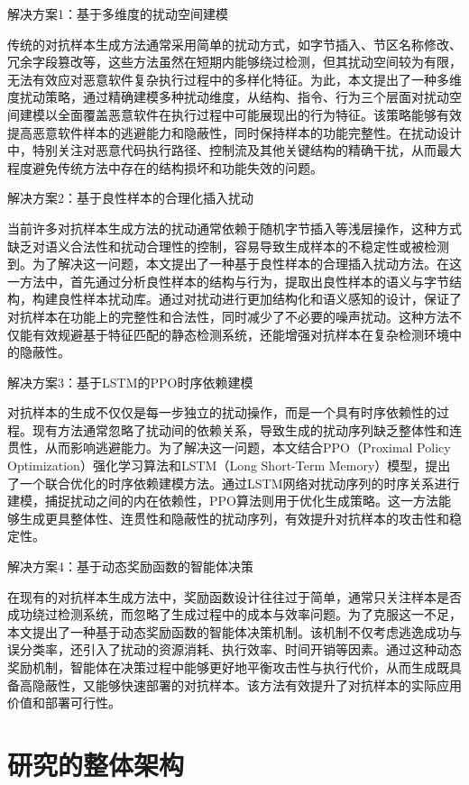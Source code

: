 解决方案1：基于多维度的扰动空间建模

传统的对抗样本生成方法通常采用简单的扰动方式，如字节插入、节区名称修改、冗余字段篡改等，这些方法虽然在短期内能够绕过检测，但其扰动空间较为有限，无法有效应对恶意软件复杂执行过程中的多样化特征。为此，本文提出了一种多维度扰动策略，通过精确建模多种扰动维度，从结构、指令、行为三个层面对扰动空间建模以全面覆盖恶意软件在执行过程中可能展现出的行为特征。该策略能够有效提高恶意软件样本的逃避能力和隐蔽性，同时保持样本的功能完整性。在扰动设计中，特别关注对恶意代码执行路径、控制流及其他关键结构的精确干扰，从而最大程度避免传统方法中存在的结构损坏和功能失效的问题。

解决方案2：基于良性样本的合理化插入扰动

当前许多对抗样本生成方法的扰动通常依赖于随机字节插入等浅层操作，这种方式缺乏对语义合法性和扰动合理性的控制，容易导致生成样本的不稳定性或被检测到。为了解决这一问题，本文提出了一种基于良性样本的合理插入扰动方法。在这一方法中，首先通过分析良性样本的结构与行为，提取出良性样本的语义与字节结构，构建良性样本扰动库。通过对扰动进行更加结构化和语义感知的设计，保证了对抗样本在功能上的完整性和合法性，同时减少了不必要的噪声扰动。这种方法不仅能有效规避基于特征匹配的静态检测系统，还能增强对抗样本在复杂检测环境中的隐蔽性。

解决方案3：基于LSTM的PPO时序依赖建模

对抗样本的生成不仅仅是每一步独立的扰动操作，而是一个具有时序依赖性的过程。现有方法通常忽略了扰动间的依赖关系，导致生成的扰动序列缺乏整体性和连贯性，从而影响逃避能力。为了解决这一问题，本文结合PPO\cite{yu2022surprising}（Proximal Policy Optimization）强化学习算法和LSTM\cite{graves2012long}（Long Short-Term Memory）模型，提出了一个联合优化的时序依赖建模方法。通过LSTM网络对扰动序列的时序关系进行建模，捕捉扰动之间的内在依赖性，PPO算法则用于优化生成策略。这一方法能够生成更具整体性、连贯性和隐蔽性的扰动序列，有效提升对抗样本的攻击性和稳定性。

解决方案4：基于动态奖励函数的智能体决策

在现有的对抗样本生成方法中，奖励函数设计往往过于简单，通常只关注样本是否成功绕过检测系统，而忽略了生成过程中的成本与效率问题。为了克服这一不足，本文提出了一种基于动态奖励函数的智能体决策机制。该机制不仅考虑逃逸成功与误分类率，还引入了扰动的资源消耗、执行效率、时间开销等因素。通过这种动态奖励机制，智能体在决策过程中能够更好地平衡攻击性与执行代价，从而生成既具备高隐蔽性，又能够快速部署的对抗样本。该方法有效提升了对抗样本的实际应用价值和部署可行性。

\section{研究的整体架构}

